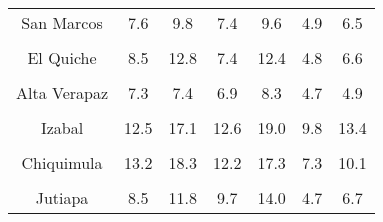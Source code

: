 \begin{tabular}[t]{ccccccc}
San Marcos & 7.6 & 9.8 & 7.4 & 9.6 & 4.9 & 6.5\\
\cellcolor[HTML]{B6B3FF}{Huehuetenango} & \cellcolor[HTML]{B6B3FF}{12.5} & \cellcolor[HTML]{B6B3FF}{17.5} & \cellcolor[HTML]{B6B3FF}{11.2} & \cellcolor[HTML]{B6B3FF}{16.6} & \cellcolor[HTML]{B6B3FF}{6.8} & \cellcolor[HTML]{B6B3FF}{9.9}\\
El Quiche & 8.5 & 12.8 & 7.4 & 12.4 & 4.8 & 6.6\\
\cellcolor[HTML]{B6B3FF}{Baja Verapaz} & \cellcolor[HTML]{B6B3FF}{9.7} & \cellcolor[HTML]{B6B3FF}{13.7} & \cellcolor[HTML]{B6B3FF}{10.1} & \cellcolor[HTML]{B6B3FF}{18.6} & \cellcolor[HTML]{B6B3FF}{5.2} & \cellcolor[HTML]{B6B3FF}{9.3}\\
Alta Verapaz & 7.3 & 7.4 & 6.9 & 8.3 & 4.7 & 4.9\\
\cellcolor[HTML]{B6B3FF}{Petén} & \cellcolor[HTML]{B6B3FF}{21.0} & \cellcolor[HTML]{B6B3FF}{28.9} & \cellcolor[HTML]{B6B3FF}{20.1} & \cellcolor[HTML]{B6B3FF}{28.1} & \cellcolor[HTML]{B6B3FF}{12.5} & \cellcolor[HTML]{B6B3FF}{16.8}\\
Izabal & 12.5 & 17.1 & 12.6 & 19.0 & 9.8 & 13.4\\
\cellcolor[HTML]{B6B3FF}{Zacapa} & \cellcolor[HTML]{B6B3FF}{11.8} & \cellcolor[HTML]{B6B3FF}{15.6} & \cellcolor[HTML]{B6B3FF}{9.2} & \cellcolor[HTML]{B6B3FF}{14.3} & \cellcolor[HTML]{B6B3FF}{6.0} & \cellcolor[HTML]{B6B3FF}{8.5}\\
Chiquimula & 13.2 & 18.3 & 12.2 & 17.3 & 7.3 & 10.1\\
\cellcolor[HTML]{B6B3FF}{Jalapa} & \cellcolor[HTML]{B6B3FF}{11.4} & \cellcolor[HTML]{B6B3FF}{14.4} & \cellcolor[HTML]{B6B3FF}{12.1} & \cellcolor[HTML]{B6B3FF}{17.9} & \cellcolor[HTML]{B6B3FF}{5.5} & \cellcolor[HTML]{B6B3FF}{8.4}\\
Jutiapa & 8.5 & 11.8 & 9.7 & 14.0 & 4.7 & 6.7\\
\bottomrule
\end{tabular}
